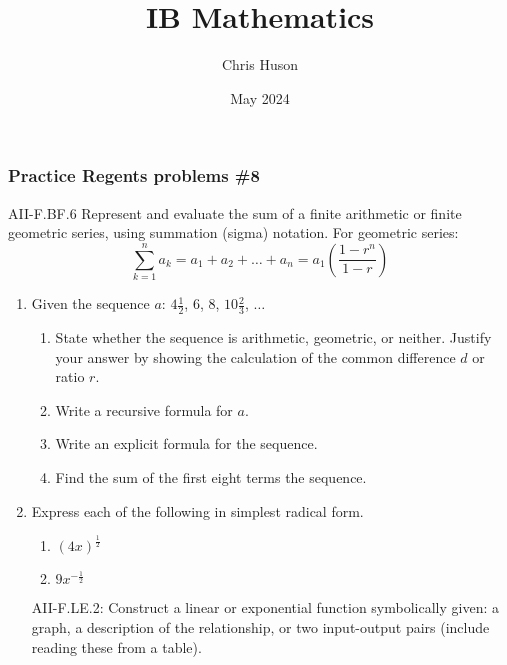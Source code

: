 \documentclass[12pt, twoside]{article}
\title{IB Mathematics}
\author{Chris Huson}
\date{May 2024}
\begin{document}
\subsubsection*{Practice Regents problems \#8}
AII-F.BF.6 Represent and evaluate the sum of a finite arithmetic
or finite geometric series, using summation (sigma) notation. For geometric series:
$$\sum_{k=1}^{n} a_k = a_1 + a_2 + \ldots + a_n = a_1 \left( \frac{1-r^n}{1-r} \right)$$

\begin{enumerate}
\item Given the sequence $a$: $4 \frac{1}{2}$, 6, 8, $10 \frac{2}{3}$, $\ldots$
\begin{enumerate}[itemsep=2cm]
    \item State whether the sequence is arithmetic, geometric, or neither. Justify your answer by showing the calculation of the common difference $d$ or ratio $r$.
    \item Write a recursive formula for $a$.
    \item Write an explicit formula for the sequence.
    \item Find the sum of the first eight terms the sequence.
\end{enumerate} \vspace{3cm}

\item Express each of the following in simplest radical form. 
\begin{multicols}{2}
    \begin{enumerate}
        \item $(4x)^{\frac{1}{2}}$
        \item $9x^{-\frac{1}{2}}$
    \end{enumerate}
\end{multicols}
\vspace{3cm}

\newpage
AII-F.LE.2: Construct a linear or exponential function symbolically given: a graph, a description of the relationship, or two input-output pairs (include reading these from a table).


\end{enumerate}
\end{document}
